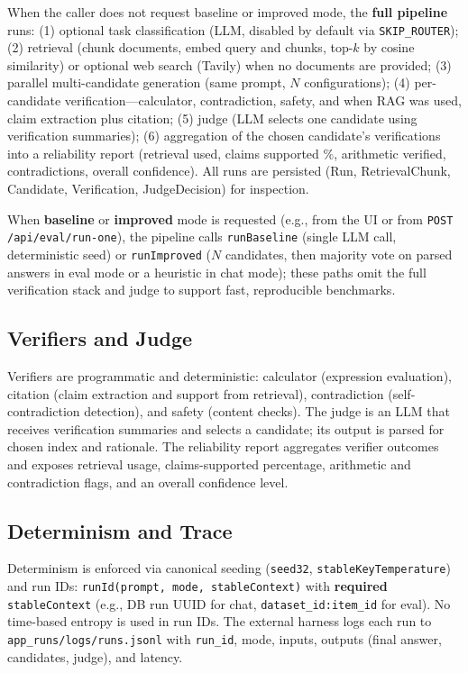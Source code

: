 \documentclass[11pt]{article}
\begin{document}
When the caller does not request baseline or improved mode, the \textbf{full pipeline} runs: (1) optional task classification (LLM, disabled by default via \texttt{SKIP\_ROUTER}); (2) retrieval (chunk documents, embed query and chunks, top-$k$ by cosine similarity) or optional web search (Tavily) when no documents are provided; (3) parallel multi-candidate generation (same prompt, $N$ configurations); (4) per-candidate verification---calculator, contradiction, safety, and when RAG was used, claim extraction plus citation; (5) judge (LLM selects one candidate using verification summaries); (6) aggregation of the chosen candidate's verifications into a reliability report (retrieval used, claims supported \%, arithmetic verified, contradictions, overall confidence). All runs are persisted (Run, RetrievalChunk, Candidate, Verification, JudgeDecision) for inspection.

When \textbf{baseline} or \textbf{improved} mode is requested (e.g., from the UI or from \texttt{POST /api/eval/run-one}), the pipeline calls \texttt{runBaseline} (single LLM call, deterministic seed) or \texttt{runImproved} ($N$ candidates, then majority vote on parsed answers in eval mode or a heuristic in chat mode); these paths omit the full verification stack and judge to support fast, reproducible benchmarks.

\subsection{Verifiers and Judge}
Verifiers are programmatic and deterministic: calculator (expression evaluation), citation (claim extraction and support from retrieval), contradiction (self-contradiction detection), and safety (content checks). The judge is an LLM that receives verification summaries and selects a candidate; its output is parsed for chosen index and rationale. The reliability report aggregates verifier outcomes and exposes retrieval usage, claims-supported percentage, arithmetic and contradiction flags, and an overall confidence level.

\subsection{Determinism and Trace}
Determinism is enforced via canonical seeding (\texttt{seed32}, \texttt{stableKeyTemperature}) and run IDs: \texttt{runId(prompt, mode, stableContext)} with \textbf{required} \texttt{stableContext} (e.g., DB run UUID for chat, \texttt{dataset\_id:item\_id} for eval). No time-based entropy is used in run IDs. The external harness logs each run to \texttt{app\_runs/logs/runs.jsonl} with \texttt{run\_id}, mode, inputs, outputs (final answer, candidates, judge), and latency.
\end{document}
